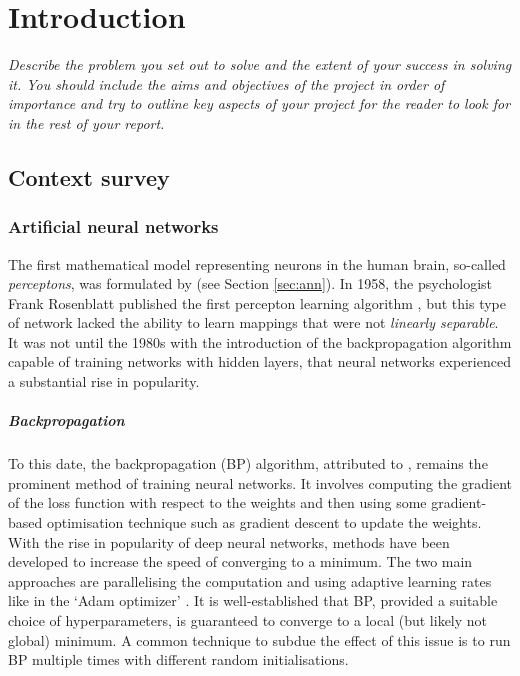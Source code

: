 \chapter{Introduction}
\textit{Describe the problem you set out to solve and the
extent of your success in solving it. You should include
the aims and objectives of the project in order of
importance and try to outline key aspects of your
project for the reader to look for in the rest of your
report.}
\todo

\section{Context survey}
\subsection{Artificial neural networks}
\label{sec:context_anns}
The first mathematical model representing neurons in the human brain, so-called \textit{perceptons}, was formulated by \textcite{mcculloch1943} (see Section \ref{sec:ann}).
In 1958, the psychologist Frank Rosenblatt published the first percepton learning algorithm \cite{rosenblatt1958}, but this type of network lacked the ability to learn mappings that were not \textit{linearly separable}.
It was not until the 1980s with the introduction of the backpropagation algorithm capable of training networks with hidden layers, that neural networks experienced a substantial rise in popularity.

\paragraph{Backpropagation}
To this date, the backpropagation (BP) algorithm, attributed to \textcite{rumelhart1986}, remains the prominent method of training neural networks.
It involves computing the gradient of the loss function with respect to the weights and then using some gradient-based optimisation technique such as gradient descent to update the weights.
With the rise in popularity of deep neural networks, methods have been developed to increase the speed of converging to a minimum. 
The two main approaches are parallelising the computation and using adaptive learning rates like in the `Adam optimizer' \cite{kingma2014}.
It is well-established that BP, provided a suitable choice of hyperparameters, is guaranteed to converge to a local (but likely not global) minimum.
A common technique to subdue the effect of this issue is to run BP multiple times with different random initialisations.

